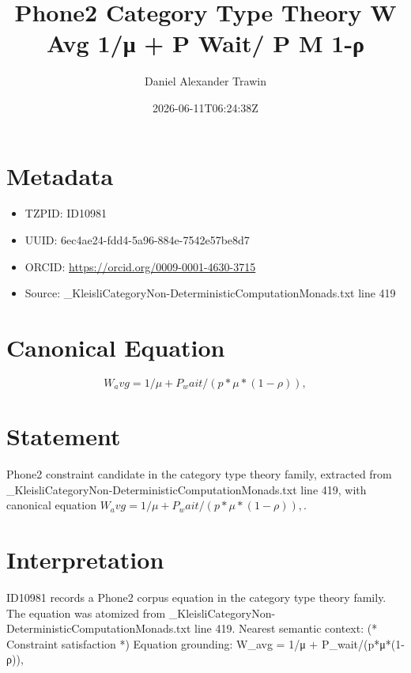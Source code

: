 \documentclass[11pt]{article}
\title{Phone2 Category Type Theory W Avg 1/μ + P Wait/ P Μ 1-ρ}
\author{Daniel Alexander Trawin}
\date{2026-06-11T06:24:38Z}
\begin{document}
\maketitle
\section*{Metadata}
\begin{itemize}
\item TZPID: ID10981
\item UUID: 6ec4ae24-fdd4-5a96-884e-7542e57be8d7
\item ORCID: \url{https://orcid.org/0009-0001-4630-3715}
\item Source: _KleisliCategoryNon-DeterministicComputationMonads.txt line 419
\end{itemize}
\section*{Canonical Equation}
\[
W_avg = 1/μ + P_wait/(p*μ*(1-ρ)),
\]
\section*{Statement}
Phone2 constraint candidate in the category type theory family, extracted from _KleisliCategoryNon-DeterministicComputationMonads.txt line 419, with canonical equation $W_avg = 1/μ + P_wait/(p*μ*(1-ρ)),$.
\section*{Interpretation}
ID10981 records a Phone2 corpus equation in the category type theory family. The equation was atomized from _KleisliCategoryNon-DeterministicComputationMonads.txt line 419. Nearest semantic context: (* Constraint satisfaction *) Equation grounding: W_avg = 1/μ + P_wait/(p*μ*(1-ρ)),
\end{document}
